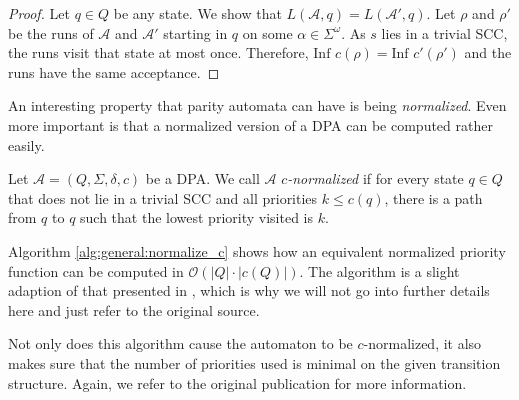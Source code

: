 \begin{proof}
	Let $q \in Q$ be any state. We show that $L(\mathcal{A}, q) = L(\mathcal{A}', q)$. Let $\rho$ and $\rho'$ be the runs of $\mathcal{A}$ and $\mathcal{A}'$ starting in $q$ on some $\alpha \in \Sigma^\omega$. As $s$ lies in a trivial SCC, the runs visit that state at most once. Therefore, $\text{Inf } c(\rho) = \text{Inf } c'(\rho')$ and the runs have the same acceptance.
\end{proof}

\vspace{10pt}

An interesting property that parity automata can have is being \emph{normalized}. Even more important is that a normalized version of a DPA can be computed rather easily.

\begin{defn}
	Let $\mathcal{A} = (Q, \Sigma, \delta, c)$ be a DPA. We call $\mathcal{A}$ \emph{$c$-normalized} if for every state $q \in Q$ that does not lie in a trivial SCC and all priorities $k \leq c(q)$, there is a path from $q$ to $q$ such that the lowest priority visited is $k$.
\end{defn}

Algorithm \ref{alg:general:normalize_c} shows how an equivalent normalized priority function can be computed in \linebreak $\mathcal{O}(|Q| \cdot |c(Q)|)$. The algorithm is a slight adaption of that presented in \cite{CartonMaceiras99}, which is why we will not go into further details here and just refer to the original source.

Not only does this algorithm cause the automaton to be $c$-normalized, it also makes sure that the number of priorities used is minimal on the given transition structure. Again, we refer to the original publication for more information.

